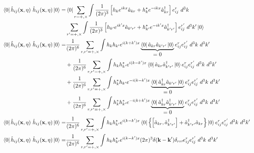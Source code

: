 \begin{equation*}
    \begin{split}
        \bra{0} \hat{h}_{ij} (\textbf{x},\eta) \ \hat{h}_{ij} (\textbf{x}, \eta) \ket{0} =& \bra{0} \sum_{r = +, \times} \int \frac{1}{(2 \pi)^{3}} \left[ h_k e^{ikx} \hat{a}_{kr} + h^*_k e^{-ikx} \hat{a}^\dagger_{kr} \right] e_{ij}^r \ d^3 k \\
        &\sum_{r^\prime = +, \times} \int \frac{1}{(2 \pi)^{3}} \left[ h_{k^\prime} e^{ik^\prime x} \hat{a}_{k^\prime r^\prime} + h^*_{k^\prime} e^{-ik^\prime x} \hat{a}^\dagger_{k^\prime r^\prime} \right] e_{ij}^{r^\prime} \ d^3 k^\prime \ket{0}\\
        \bra{0} \hat{h}_{ij} (\textbf{x},\eta) \ \hat{h}_{ij} (\textbf{x}, \eta) \ket{0} =& \frac{1}{(2\pi)^6} \sum_{r,r^\prime = +, \times} \int h_k h_{k^\prime} e^{i (k + k^\prime) x} \underbrace{\bra{0} \hat{a}_{kr} \hat{a}_{k^\prime r^\prime} \ket{0}}_{\displaystyle = 0} e_{ij}^r e_{ij}^{r^\prime} \ d^3 k \ d^3 k^\prime\\
        &+ \frac{1}{(2\pi)^6} \sum_{r,r^\prime = +, \times} \int h_k h_{k^\prime}^* e^{i (k - k^\prime) x} \bra{0} \hat{a}_{kr} \hat{a}^\dagger_{k^\prime r^\prime} \ket{0} e_{ij}^r e_{ij}^{r^\prime} \ d^3 k \ d^3 k^\prime\\
        &+ \frac{1}{(2\pi)^6} \sum_{r,r^\prime = +, \times} \int h^*_k h_{k^\prime} e^{-i (k - k^\prime) x} \underbrace{\bra{0} \hat{a}^\dagger_{kr} \hat{a}_{k^\prime r^\prime} \ket{0}}_{\displaystyle = 0} e_{ij}^r e_{ij}^{r^\prime} \ d^3 k \ d^3 k^\prime\\
        &+ \frac{1}{(2\pi)^6} \sum_{r,r^\prime = +, \times} \int h^*_k h^*_{k^\prime} e^{-i (k + k^\prime) x} \underbrace{\bra{0} \hat{a}^\dagger_{kr} \hat{a}_{k^\prime r^\prime}^\dagger \ket{0}}_{\displaystyle = 0} e_{ij}^r e_{ij}^{r^\prime} \ d^3 k \ d^3 k^\prime\\
        \bra{0} \hat{h}_{ij} (\textbf{x},\eta) \ \hat{h}_{ij} (\textbf{x}, \eta) \ket{0} =& \frac{1}{(2\pi)^6} \sum_{r,r^\prime = +, \times} \int h_k h_{k^\prime}^* e^{i (k - k^\prime) x} \bra{0} \left\{ \left[ \hat{a}_{kr}, \hat{a}^\dagger_{k^\prime r^\prime} \right] + \hat{a}^\dagger_{k^\prime r^\prime} \hat{a}_{kr} \right\} \ket{0} e_{ij}^r e_{ij}^{r^\prime} \ d^3 k \ d^3 k^\prime\\
        \bra{0} \hat{h}_{ij} (\textbf{x},\eta) \ \hat{h}_{ij} (\textbf{x}, \eta) \ket{0} =& \frac{1}{(2\pi)^6} \sum_{r, r^\prime = +, \times} \int h_k h_{k^\prime}^* e^{i (k - k^\prime) x} (2\pi)^3 \delta (\textbf{k} - \textbf{k}^\prime) \delta_{r r\prime} e_{ij}^r e_{ij}^{r^\prime} \ d^3 k \ d^3 k^\prime\\

\end{split}
\end{equation*}
